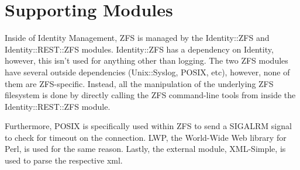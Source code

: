 \section{Supporting Modules}

Inside of Identity Management, ZFS is managed by the Identity::ZFS and Identity::REST::ZFS modules. Identity::ZFS has a dependency on Identity, however, this isn't used for anything other than logging. The two ZFS modules have several outside dependencies (Unix::Syslog, POSIX, etc), however, none of them are ZFS-specific. Instead, all the manipulation of the underlying ZFS filesystem is done by directly calling the ZFS command-line tools from inside the Identity::REST::ZFS module.

Furthermore, POSIX is specifically used within ZFS to send a SIGALRM signal to check for timeout on the connection. LWP, the World-Wide Web library for Perl, is used for the same reason. Lastly, the external module, XML-Simple, is used to parse the respective xml. 